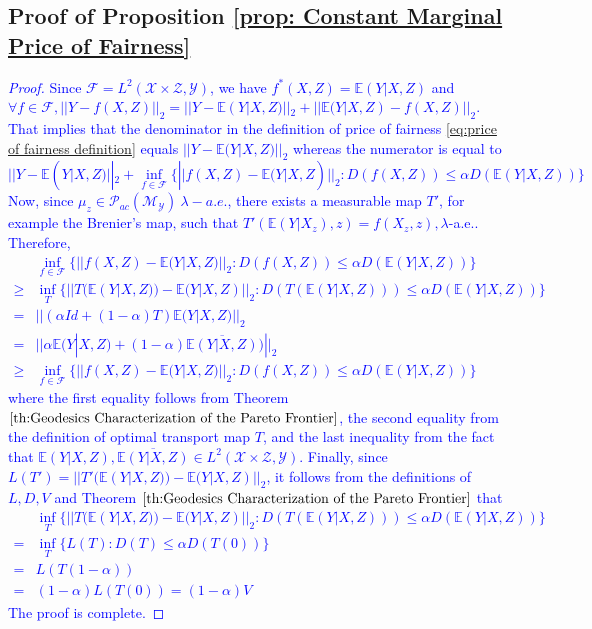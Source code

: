\documentclass[twoside,11pt]{article}
\newcommand{\edit}[1]{\textcolor{blue}{#1}}
\begin{document}
\subsection{Proof of Proposition \ref{prop: Constant Marginal Price of Fairness}}

\edit{\begin{proof}
Since $\mathcal{F} = L^2(\mathcal{X} \times \mathcal{Z},\mathcal{Y})$, we have $f^*(X,Z) = \mathbb{E}(Y|X,Z)$ and $\forall f \in \mathcal{F}, ||Y - f(X,Z)||_2 = ||Y - \mathbb{E}(Y|X,Z)||_2 + ||\mathbb{E}(Y|X,Z) - f(X,Z)||_2$. That implies that the denominator in the definition of price of fairness \eqref{eq:price of fairness definition} equals $||Y - \mathbb{E}(Y|X,Z)||_2$ whereas the numerator is equal to
\begin{equation}
||Y - \mathbb{E}(Y|X,Z)||_2 + \inf_{f \in \mathcal{F}} \{||f(X,Z) - \mathbb{E}(Y|X,Z)||_2 : D(f(X,Z)) \leq \alpha D(\mathbb{E}(Y|X,Z))\}
\end{equation}
Now, since $\mu_z \in \mathcal{P}_{ac}(\mathcal{M}_{\mathcal{Y}}) \ \lambda-a.e.$, there exists a measurable map $T'$, for example the Brenier's map, such that $T'(\mathbb{E}(Y|X_z), z) = f(X_z,z), \lambda$-a.e.. Therefore,
\begin{align*}
& \inf_{f \in \mathcal{F}} \{||f(X,Z) - \mathbb{E}(Y|X,Z)||_2 : D(f(X,Z)) \leq \alpha D(\mathbb{E}(Y|X,Z))\}\\
\geq & \inf_{T} \{||T(\mathbb{E}(Y|X,Z)) - \mathbb{E}(Y|X,Z)||_2 : D(T(\mathbb{E}(Y|X,Z))) \leq \alpha D(\mathbb{E}(Y|X,Z))\} \\
= & || (\alpha Id + (1-\alpha) T) \mathbb{E}(Y|X,Z)||_2 \\
= & ||\alpha \mathbb{E}(Y|X,Z) + (1-\alpha) \overline{\mathbb{E}(Y|X,Z)} )||_2\\
\geq & \inf_{f \in \mathcal{F}} \{||f(X,Z) - \mathbb{E}(Y|X,Z)||_2 : D(f(X,Z)) \leq \alpha D(\mathbb{E}(Y|X,Z))\}
\end{align*}
where the first equality follows from Theorem $\ref{th:Geodesics Characterization of the Pareto Frontier}$, the second equality from the definition of optimal transport map $T$, and the last inequality from the fact that $\mathbb{E}(Y|X,Z), \overline{\mathbb{E}(Y|X,Z)} \in L^2(\mathcal{X} \times \mathcal{Z},\mathcal{Y})$.
Finally, since $L(T') = ||T'(\mathbb{E}(Y|X,Z)) - \mathbb{E}(Y|X,Z)||_2$, it follows from the definitions of $L,D,V$ and Theorem $\ref{th:Geodesics Characterization of the Pareto Frontier}$ that
\begin{align*}
& \inf_{T} \{||T(\mathbb{E}(Y|X,Z)) - \mathbb{E}(Y|X,Z)||_2 : D(T(\mathbb{E}(Y|X,Z))) \leq \alpha D(\mathbb{E}(Y|X,Z))\}\\
= & \inf_{T} \{L(T) : D(T) \leq \alpha D(T(0))\}\\
= & L(T(1-\alpha))\\
= & (1-\alpha)L(T(0)) = (1-\alpha)V
\end{align*}
The proof is complete.
\end{proof}}
\fi
\end{document}
